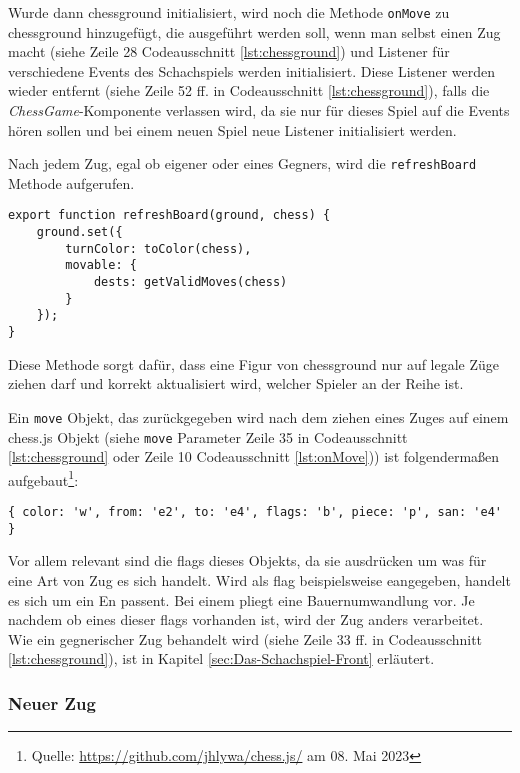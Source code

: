 Wurde dann chessground initialisiert, wird noch die Methode \verb|onMove| zu chessground hinzugefügt, die ausgeführt werden soll, wenn man selbst einen Zug macht (siehe Zeile 28 Codeausschnitt \ref{lst:chessground}) und Listener für verschiedene Events des Schachspiels werden initialisiert. Diese Listener werden wieder entfernt (siehe Zeile 52 ff. in Codeausschnitt \ref{lst:chessground}), falls die \textit{ChessGame}-Komponente verlassen wird, da sie nur für dieses Spiel auf die Events hören sollen und bei einem neuen Spiel neue Listener initialisiert werden.

Nach jedem Zug, egal ob eigener oder eines Gegners, wird die \verb|refreshBoard| Methode aufgerufen.

\begin{lstlisting}[style=codeStyle, caption={Die refreshBoard Methode}, label={lst:refreshBoard}]
export function refreshBoard(ground, chess) {
    ground.set({
        turnColor: toColor(chess),
        movable: {
            dests: getValidMoves(chess)
        }
    });
}
\end{lstlisting}

Diese Methode sorgt dafür, dass eine Figur von chessground nur auf legale Züge ziehen darf und korrekt aktualisiert wird, welcher Spieler an der Reihe ist.

Ein \verb|move| Objekt, das zurückgegeben wird nach dem ziehen eines Zuges auf einem chess.js Objekt (siehe \verb|move| Parameter Zeile 35 in Codeausschnitt \ref{lst:chessground} oder Zeile 10 Codeausschnitt \ref{lst:onMove})) ist folgendermaßen aufgebaut\footnote{Quelle: \url{https://github.com/jhlywa/chess.js/} am 08. Mai 2023}:
\begin{verbatim}
{ color: 'w', from: 'e2', to: 'e4', flags: 'b', piece: 'p', san: 'e4' }
\end{verbatim}
Vor allem relevant sind die flags dieses Objekts, da sie ausdrücken um was für eine Art von Zug es sich handelt. Wird als flag beispielsweise \glqq e\grqq{ }angegeben, handelt es sich um ein En passent. Bei einem \glqq p\grqq{ }liegt eine Bauernumwandlung vor.
Je nachdem ob eines dieser flags vorhanden ist, wird der Zug anders verarbeitet. Wie ein gegnerischer Zug behandelt wird (siehe Zeile 33 ff. in Codeausschnitt \ref{lst:chessground}), ist in Kapitel \ref{sec:Das-Schachspiel-Front} erläutert.

\subsubsection{Neuer Zug}

